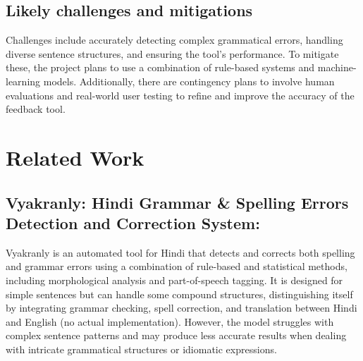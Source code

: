 \documentclass[11pt,a4paper]{article}
\begin{document}
\subsection{Likely challenges and mitigations}
Challenges include accurately detecting complex grammatical errors, handling diverse sentence structures, and ensuring the tool's performance. To mitigate these, the project plans to use a combination of rule-based systems and machine-learning models. Additionally, there are contingency plans to involve human evaluations and real-world user testing to refine and improve the accuracy of the feedback tool.
\\
\section{Related Work}
\subsection{Vyakranly: Hindi Grammar \& Spelling Errors Detection and Correction System:} 

Vyakranly is an automated tool for Hindi that detects and corrects both spelling and grammar errors using a combination of rule-based and statistical methods, including morphological analysis and part-of-speech tagging. It is designed for simple sentences but can handle some compound structures, distinguishing itself by integrating grammar checking, spell correction, and translation between Hindi and English (no actual implementation). However, the model struggles with complex sentence patterns and may produce less accurate results when dealing with intricate grammatical structures or idiomatic expressions.\cite{s_vyakranly_2023}
\end{document}
